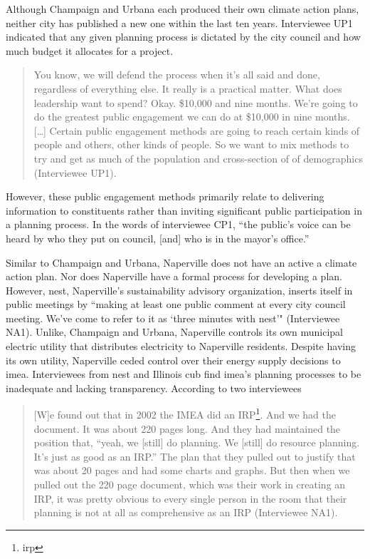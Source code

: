 Although Champaign and Urbana each produced their own climate action plans,
neither city has published a new one within the last ten years. Interviewee UP1
indicated that any given planning process is dictated by the city council and
how much budget it allocates for a project.
\begin{quote}
    You know, we will defend the process when it's all said and done, regardless
    of everything else. It really is a practical matter. What does leadership
    want to spend? Okay. \$10,000 and nine months. We're going to do the
    greatest public engagement we can do at \$10,000 in nine months. [\dots]
    Certain public engagement methods are going to reach certain kinds of people
    and others, other kinds of people. So we want to mix methods to try and get
    as much of the population and cross-section of of demographics (Interviewee
    UP1).
\end{quote}
However, these public engagement methods primarily relate to delivering
information to constituents rather than inviting significant public
participation in a planning process. In the words of interviewee CP1, ``the
public's voice can be heard by who they put on council, [and] who is in the
mayor's office.''

Similar to Champaign and Urbana, Naperville does not have an active a climate
action plan. Nor does Naperville have a formal process for developing a plan.
However, \ac{nest}, Naperville's sustainability advisory organization, inserts
itself in public meetings by ``making at least one public comment at every city
council meeting. We've come to refer to it as `three minutes with \ac{nest}'"
(Interviewee NA1). Unlike, Champaign and Urbana, Naperville controls its own
municipal electric utility that distributes electricity to Naperville residents.
Despite having its own utility, Naperville ceded control over their energy
supply decisions to \ac{imea}. Interviewees from \ac{nest} and Illinois \ac{cub}
find \ac{imea}'s planning processes to be inadequate and lacking transparency.
According to two interviewees

\begin{quote}
    [W]e found out that in 2002 the IMEA did an IRP\footnote{\Acf{irp}}. And we
    had the document. It was about 220 pages long. And they had maintained the
    position that, ``yeah, we [still] do planning. We [still] do resource
    planning. It's just as good as an IRP.'' The plan that they pulled out to
    justify that was about 20 pages and had some charts and graphs. But then
    when we pulled out the 220 page document, which was their work in creating
    an IRP, it was pretty obvious to every single person in the room that their
    planning is not at all as comprehensive as an IRP (Interviewee NA1).
\end{quote}

